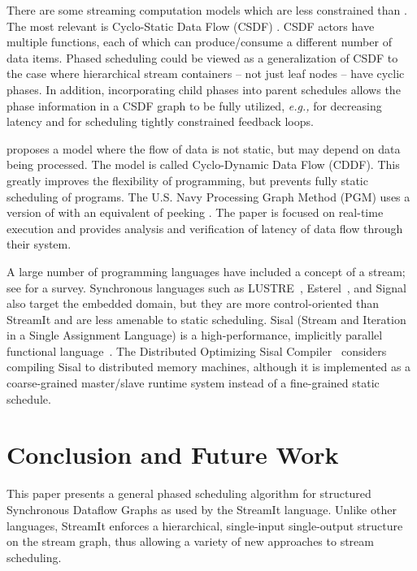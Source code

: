 \documentclass{sig-alt-full}
\begin{document}
There are some streaming computation models which are less constrained
than {\SDF}. The most relevant is Cyclo-Static Data Flow (CSDF)
\cite{BELP96,parks95comparison}.  CSDF actors have multiple {\work}
functions, each of which can produce/consume a different number of
data items.  Phased scheduling could be viewed as a generalization of
CSDF to the case where hierarchical stream containers -- not just leaf
nodes -- have cyclic phases.  In addition, incorporating child phases
into parent schedules allows the phase information in a CSDF graph to
be fully utilized, {\it e.g.,} for decreasing latency and for
scheduling tightly constrained feedback loops.

\cite{wauters96cyclodynamic} proposes a model where the flow of data
is not static, but may depend on data being processed. The model is
called Cyclo-Dynamic Data Flow (CDDF). This greatly improves the
flexibility of programming, but prevents fully static scheduling of
programs. The U.S. Navy Processing Graph Method (PGM) uses a version
of {\SDF} with an equivalent of peeking \cite{goddard00navy}.  The
paper is focused on real-time execution and provides analysis and
verification of latency of data flow through their system.

A large number of programming languages have included a concept of a
stream; see \cite{survey97} for a survey.  Synchronous languages such
as LUSTRE~\cite{lustre}, Esterel~\cite{esterel92}, and
Signal~\cite{signal} also target the embedded domain, but they are
more control-oriented than StreamIt and are less amenable to static
scheduling.  Sisal (Stream and Iteration in a Single Assignment
Language) is a high-performance, implicitly parallel functional
language~\cite{sisal}.  The Distributed Optimizing Sisal
Compiler~\cite{sisal} considers compiling Sisal to distributed memory
machines, although it is implemented as a coarse-grained master/slave
runtime system instead of a fine-grained static schedule.


\section{Conclusion and Future Work}
\label{chpt:conclusion}

This paper presents a general phased scheduling algorithm for
structured Synchronous Dataflow Graphs as used by the StreamIt
language.  Unlike other languages, StreamIt enforces a hierarchical,
single-input single-output structure on the stream graph, thus
allowing a variety of new approaches to stream scheduling.
\end{document}
